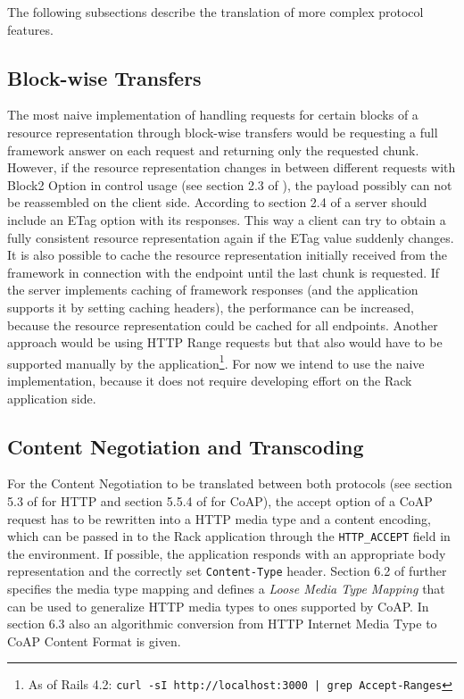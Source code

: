 	The following subsections describe the translation of more complex protocol
	features.

	\subsection{Block-wise Transfers}

		The most naive implementation of handling requests for certain blocks
		of a resource representation through block-wise transfers \cite{block}
		would be requesting a full framework answer on each request and
		returning only the requested chunk. However, if the resource
		representation changes in between different requests with Block2 Option
		in control usage (see section 2.3 of \cite{block}), the payload
		possibly can not be reassembled on the client side.  According to
		section 2.4 of \cite{block} a server should include an ETag option with
		its responses. This way a client can try to obtain a fully consistent
		resource representation again if the ETag value suddenly changes. It is
		also possible to cache the resource representation initially received
		from the framework in connection with the endpoint until the last chunk
		is requested. If the server implements caching of framework responses
		(and the application supports it by setting caching headers), the
		performance can be increased, because the resource representation could
		be cached for all endpoints.  Another approach would be using \ac{HTTP}
		Range requests \cite{http-3} but that also would have to be supported
		manually by the application\footnote{As of Rails 4.2: \texttt{curl -sI
		http://localhost:3000 | grep Accept-Ranges}}. For now we intend to use
		the naive implementation, because it does not require developing effort
		on the Rack application side.

	\subsection{Content Negotiation and Transcoding}
	\label{cha:design:protocol:content}

		For the Content Negotiation to be translated between both protocols
		(see section 5.3 of \cite{http-1} for \ac{HTTP} and section 5.5.4 of
		\cite{coap} for \ac{CoAP}), the accept option of a \ac{CoAP} request
		has to be rewritten into a \ac{HTTP} media type and a content encoding,
		which can be passed in to the Rack application through the
		\texttt{HTTP\_ACCEPT} field in the environment. If possible, the
		application responds with an appropriate body representation and the
		correctly set \texttt{Content-Type} header. Section 6.2 of
		\cite{coap-mapping} further specifies the media type mapping and
		defines a \emph{Loose Media Type Mapping} that can be used to
		generalize \ac{HTTP} media types to ones supported by \ac{CoAP}. In
		section 6.3 also an algorithmic conversion from \ac{HTTP} Internet
		Media Type to \ac{CoAP} Content Format is given.

